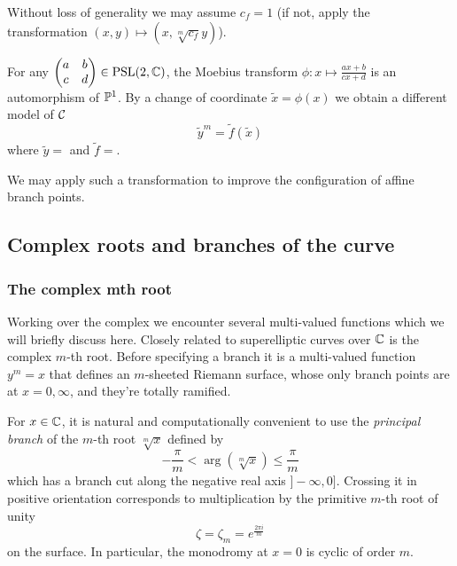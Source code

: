 \documentclass[main.tex]{subfiles}
\begin{document}
  \begin{rmk}
   Without loss of generality we may assume $c_f = 1$ (if not, apply the transformation $(x,y) \mapsto (x,\sqrt[m]{c_f}y)$).
  \end{rmk}
  \begin{rmk}
      \label{rmk:moebius}
      For any $\begin{pmatrix}a&b\\c&d\end{pmatrix}\in\PSl(2,\C)$,
      the Moebius transform $\phi:x\mapsto \frac{ax+b}{cx+d}$ is an automorphism
      of $\P^1$. By a change of coordinate $\tilde x=\phi(x)$ we obtain a different model of $\cu$
      \begin{equation}
          \tilde y^m = \tilde f(\tilde x)
      \end{equation}
      where $\tilde y=$ and $\tilde f=$.

  We may apply such a transformation to improve the configuration
  of affine branch points.
  \end{rmk}

  \subsection{Complex roots and branches of the curve}\label{subsec:roots_branches}

  \subsubsection{The complex mth root}

  Working over the complex we encounter several multi-valued functions
  which we will briefly discuss here.  Closely related to superelliptic
  curves over $\C$ is the complex $m$-th root.
  Before specifying a branch it is a multi-valued function $y^m = x$
  that defines an $m$-sheeted Riemann surface, whose only branch points
  are at $x = 0,\infty$, and they're totally ramified.

  For $x\in\C$, it is natural and computationally convenient to use the
  \emph{principal branch} of the $m$-th root $\sqrt[m]x$ defined by
  \begin{equation}
      \label{eq:principal_mth_root}
      -\frac{π}m<\arg(\sqrt[m]x)\leq\frac{π}m
  \end{equation}
  which has a branch cut along the negative real axis $]\!-\infty,0]$.
  Crossing it in positive orientation corresponds to multiplication by
  the primitive $m$-th root of unity
  \begin{equation}
      \label{eq:zeta}
  \zeta = \zeta_m = e^{\frac{2\pi i }{m}}
  \end{equation}
  on the surface. In
  particular, the monodromy at $x=0$ is cyclic of order $m$.
\end{document}
